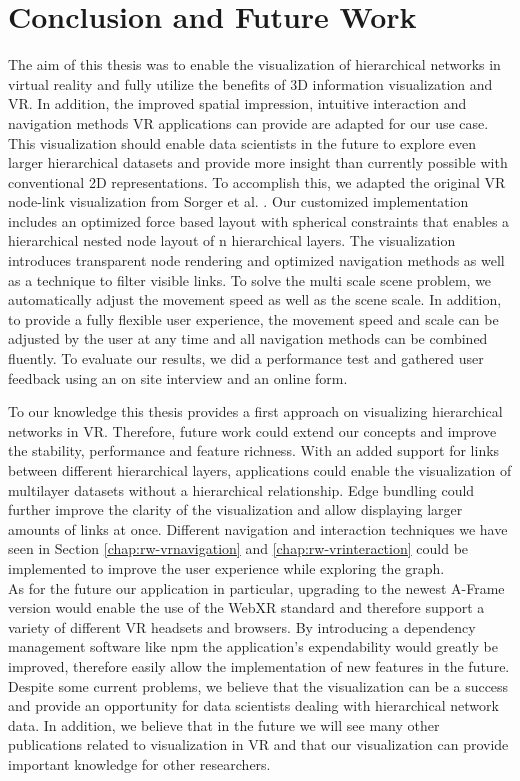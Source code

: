 \chapter{Conclusion and Future Work}
\label{chap:conclusion}

The aim of this thesis was to enable the visualization of hierarchical networks in virtual reality and fully utilize the benefits of 3D information visualization and VR. In addition, the improved spatial impression, intuitive interaction and navigation methods VR applications can provide are adapted for our use case. 
This visualization should enable data scientists in the future to explore even larger hierarchical datasets and provide more insight than currently possible with conventional 2D representations.
To accomplish this, we adapted the original VR node-link visualization from Sorger et al. \cite{sorger_immersive_2019}. 
Our customized implementation includes an optimized force based layout with spherical constraints that enables a hierarchical nested node layout of n hierarchical layers.
The visualization introduces transparent node rendering and optimized navigation methods as well as a technique to filter visible links. 
To solve the multi scale scene problem, we automatically adjust the movement speed as well as the scene scale.
In addition, to provide a fully flexible user experience, the movement speed and scale can be adjusted by the user at any time and all navigation methods can be combined fluently.
To evaluate our results, we did a performance test and gathered user feedback using an on site interview and an online form.

To our knowledge this thesis provides a first approach on visualizing hierarchical networks in VR. Therefore, future work could extend our concepts and improve the stability, performance and feature richness.
With an added support for links between different hierarchical layers, applications could enable the visualization of multilayer datasets without a hierarchical relationship. Edge bundling could further improve the clarity of the visualization and allow displaying larger amounts of links at once. Different navigation and interaction techniques we have seen in Section \ref{chap:rw-vrnavigation} and \ref{chap:rw-vrinteraction} could be implemented to improve the user experience while exploring the graph.\
\\
As for the future our application in particular, upgrading to the newest A-Frame version would enable the use of the WebXR standard and therefore support a variety of different VR headsets and browsers. By introducing a dependency management software like npm the application's expendability would greatly be improved, therefore easily allow the implementation of new features in the future.
\\
Despite some current problems, we believe that the visualization can be a success and provide an opportunity for data scientists dealing with hierarchical network data. In addition, we believe that in the future we will see many other publications related to visualization in VR and that our visualization can provide important knowledge for other researchers.